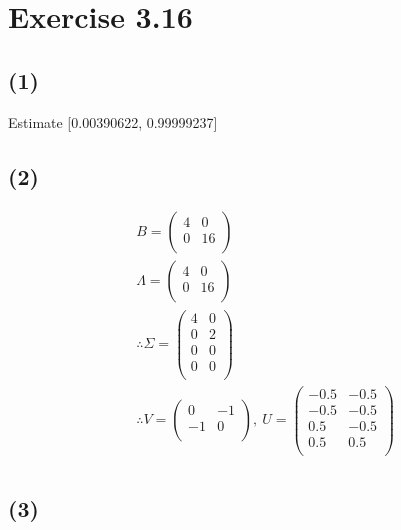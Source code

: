\documentclass[a4paper, 11pt]{article}
\begin{document}
\section*{Exercise 3.16}

\subsection*{(1)}

Estimate [0.00390622, 0.99999237]

\subsection*{(2)}

\begin{align*}
    & B = \begin{pmatrix}
        4 & 0 \\
        0 & 16 \\
    \end{pmatrix} \\
    & \Lambda = \begin{pmatrix}
        4 & 0 \\
        0 & 16 \\
    \end{pmatrix} \\
    & \therefore \Sigma = \begin{pmatrix}
        4 & 0 \\
        0 & 2 \\
        0 & 0 \\
        0 & 0 \\
    \end{pmatrix} \\
    & \therefore V = \begin{pmatrix}
        0 & -1 \\
        -1 & 0 \\
    \end{pmatrix},\ U = \begin{pmatrix}
        -0.5 & -0.5 \\
        -0.5 & -0.5 \\
        0.5  & -0.5 \\
        0.5  & 0.5  \\
    \end{pmatrix} \\
\end{align*}

\subsection*{(3)}
\end{document}
